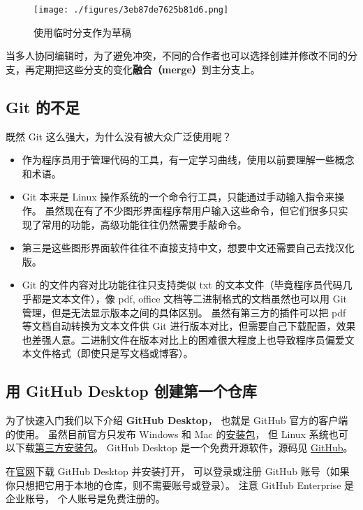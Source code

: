 \begin{figure}[ht]
\centering
\texttt{[image: ./figures/3eb87de7625b81d6.png]}
\caption{使用临时分支作为草稿} \label{fig_GitHub_6}
\end{figure}

当多人协同编辑时，为了避免冲突，不同的合作者也可以选择创建并修改不同的分支，再定期把这些分支的变化\textbf{融合（merge）}到主分支上。

\subsection{Git 的不足}
既然 Git 这么强大，为什么没有被大众广泛使用呢？
\begin{itemize}
\item 作为程序员用于管理代码的工具，有一定学习曲线，使用以前要理解一些概念和术语。
\item Git 本来是 Linux 操作系统的一个命令行工具，只能通过手动输入指令来操作。 虽然现在有了不少图形界面程序帮用户输入这些命令，但它们很多只实现了常用的功能，高级功能往往仍然需要手敲命令。
\item 第三是这些图形界面软件往往不直接支持中文，想要中文还需要自己去找汉化版。
\item Git 的文件内容对比功能往往只支持类似 txt 的文本文件（毕竟程序员代码几乎都是文本文件），像 pdf, office 文档等二进制格式的文档虽然也可以用 Git 管理，但是无法显示版本之间的具体区别。 虽然有第三方的插件可以把 pdf 等文档自动转换为文本文件供 Git 进行版本对比，但需要自己下载配置，效果也差强人意。二进制文件在版本对比上的困难很大程度上也导致程序员偏爱文本文件格式（即使只是写文档或博客）。
\end{itemize}

\subsection{用 GitHub Desktop 创建第一个仓库}
为了快速入门我们以下介绍 \textbf{GitHub Desktop}， 也就是 GitHub 官方的客户端的使用。 虽然目前官方只发布 Windows 和 Mac 的\href{https://desktop.github.com/}{安装包}， 但 Linux 系统也可以下载\href{https://github.com/shiftkey/desktop/releases}{第三方安装包}。 GitHub Desktop 是一个免费开源软件，源码见 \href{https://github.com/desktop/desktop}{GitHub}。

在\href{https://desktop.github.com/}{官网}下载 GitHub Desktop 并安装打开， 可以登录或注册 GitHub 账号（如果你只想把它用于本地的仓库，则不需要账号或登录）。 注意 GitHub Enterprise 是企业账号， 个人账号是免费注册的。

